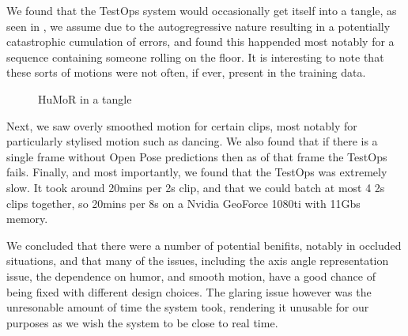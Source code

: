 We found that the TestOps system would occasionally get itself into a tangle, as seen in , we assume due to the autogregressive nature resulting in a potentially catastrophic cumulation of errors, and found this happended most notably for a sequence containing someone rolling on the floor. It is interesting to note that these sorts of motions were not often, if ever, present in the training data.

\begin{figure}[!ht]
    \centering
    \hfil
    \hfil
    \caption{HuMoR in a tangle}
    \label{fig:humor_bad_mess}
\end{figure}

Next, we saw overly smoothed motion for certain clips, most notably for particularly stylised motion such as dancing.  We also found that if there is a single frame without Open Pose predictions then as of that frame the TestOps fails. Finally, and most importantly, we found that the TestOps was extremely slow. It took around 20mins per 2s clip, and that we could batch at most 4 2s clips together, so 20mins per 8s on a Nvidia GeoForce 1080ti with 11Gbs memory.

We concluded that there were a number of potential benifits, notably in occluded situations, and that many of the issues, including the axis angle representation issue, the dependence on humor, and smooth motion, have a good chance of being fixed with different design choices.  The glaring issue however was the unresonable amount of time the system took, rendering it unusable for our purposes as we wish the system to be close to real time.

